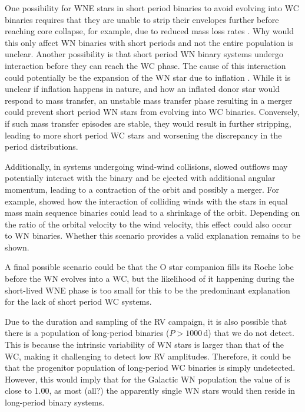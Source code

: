 One possibility for WNE stars in short period binaries to avoid evolving into WC binaries requires that they are unable to strip their envelopes further before reaching core collapse, for example, due to reduced mass loss rates \citep[possible implications from][]{neijssel_wind_2021}. Why would this only affect WN binaries with short periods and not the entire population is unclear. Another possibility is that short period WN binary systems undergo interaction before they can reach the WC phase. The cause of this interaction could potentially be the expansion of the WN star due to inflation \citep{grafener_stellar_2012,sanyal_massive_2015,grassitelli_subsonic_2018,ro_wolf-rayet_2019}. While it is unclear if inflation happens in nature, and how an inflated donor star would respond to mass transfer, an unstable mass transfer phase resulting in a merger could prevent short period WN stars from evolving into WC binaries. Conversely, if such mass transfer episodes are stable, they would result in further stripping, leading to more short period WC stars and worsening the discrepancy in the period distributions.

Additionally, in systems undergoing wind-wind collisions, slowed outflows may potentially interact with the binary and be ejected with additional angular momentum, leading to a contraction of the orbit and possibly a merger. For example, \citet{macleod_pre-common-envelope_2020} showed how the interaction of colliding winds with the stars in equal mass main sequence binaries could lead to a shrinkage of the orbit. Depending on the ratio of the orbital velocity to the wind velocity, this effect could also occur to WN binaries. Whether this scenario provides a valid explanation remains to be shown.

A final possible scenario could be that the O star companion fills its Roche lobe before the WN evolves into a WC, but the likelihood of it happening during the short-lived WNE phase is too small for this to be the predominant explanation for the lack of short period WC systems.

Due to the duration and sampling of the RV campaign, it is also possible that there is a population of long-period binaries ($P>1000\,$d) that we do not detect. This is because the intrinsic variability of WN stars is larger than that of the WC, making it challenging to detect low RV amplitudes. Therefore, it could be that the progenitor population of long-period WC binaries is simply undetected. However, this would imply that for the Galactic WN population the value of \fintWN{} is close to 1.00, as most (all?) the apparently single WN stars would then reside in long-period binary systems.

